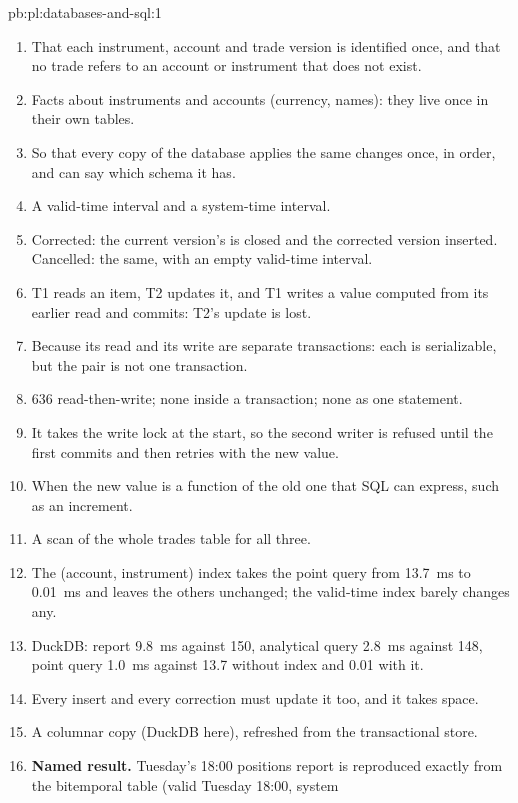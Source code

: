\begin{solution}{pb:pl:databases-and-sql:1}
\begin{enumerate}
\item That each instrument, account and trade version is identified once, and that no trade refers to an account or instrument that does not
exist.
\item Facts about instruments and accounts (currency, names): they live once in their own tables.
\item So that every copy of the database applies the same changes once, in order, and can say which schema it has.
\item A valid-time interval and a system-time interval.
\item Corrected: the current version's  is closed and the corrected version inserted. Cancelled: the same, with an empty valid-time
interval.
\item T1 reads an item, T2 updates it, and T1 writes a value computed from its earlier read and commits: T2's update is lost.
\item Because its read and its write are separate transactions: each is serializable, but the pair is not one transaction.
\item 636 read-then-write; none inside a transaction; none as one statement.
\item It takes the write lock at the start, so the second writer is refused until the first commits and then retries with the new value.
\item When the new value is a function of the old one that SQL can express, such as an increment.
\item A scan of the whole trades table for all three.
\item The (account, instrument) index takes the point query from 13.7~ms to 0.01~ms and leaves the others unchanged; the valid-time index
barely changes any.
\item DuckDB: report 9.8~ms against 150, analytical query 2.8~ms against 148, point query 1.0~ms against 13.7 without index and 0.01 with it.
\item Every insert and every correction must update it too, and it takes space.
\item A columnar copy (DuckDB here), refreshed from the transactional store.
\item \textbf{Named result.} Tuesday's 18:00 positions report is reproduced exactly from the bitemporal table (valid Tuesday 18:00, system

\end{enumerate}
\end{solution}
